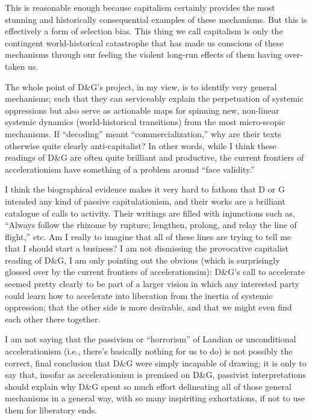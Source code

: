\documentclass[a4paper,12pt,margin=.5in]{article}
\begin{document}
This is reasonable enough because capitalism certainly provides the most
stunning and historically consequential examples of these mechanisms.
But this is effectively a form of selection bias. This thing we call
capitalism is only the contingent world-historical catastrophe that has
made us conscious of these mechanisms through our feeling the violent
long-run effects of them having over-taken us.

The whole point of D\&G's project, in my view, is to identify very
general mechanisms; such that they can serviceably explain the
perpetuation of systemic oppressions but also serve as actionable maps
for spinning new, non-linear systemic dynamics (world-historical
transitions) from the most micro-scopic mechanisms. If ``decoding''
meant ``commercialization,'' why are their texts otherwise quite clearly
anti-capitalist? In other words, while I think these readings of D\&G
are often quite brilliant and productive, the current frontiers of
accelerationism have something of a problem around ``face validity.''

I think the biographical evidence makes it very hard to fathom that D or
G intended any kind of passive capitulationism, and their works are a
brilliant catalogue of calls to activity. Their writings are filled with
injunctions such as, ``Always follow the rhizome by rupture; lengthen,
prolong, and relay the line of flight,'' etc. Am I really to imagine
that all of these lines are trying to tell me that I should start a
business? I am not dismissing the provocative capitalist reading of
D\&G, I am only pointing out the obvious (which is surprisingly glossed
over by the current frontiers of accelerationsim): D\&G's call to
accelerate seemed pretty clearly to be part of a larger vision in which
any interested party could learn how to accelerate into liberation from
the inertia of systemic oppression; that the other side is more
desirable, and that we might even find each other there together.

I am not saying that the passivism or ``horrorism'' of Landian or
unconditional accelerationism (i.e., there's basically nothing for us to
do) is not possibly the correct, final conclusion that D\&G were simply
incapable of drawing; it is only to say that, insofar as accelerationism
is premised on D\&G, passivist interpretations should explain why D\&G
spent so much effort delineating all of those general mechanisms in a
general way, with so many inspiriting exhortations, if not to use them
for liberatory ends.
\end{document}
